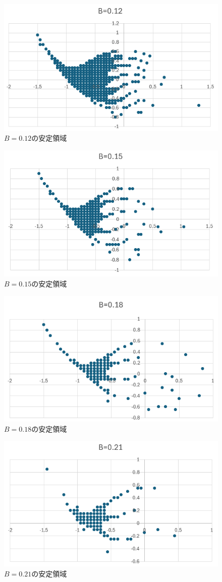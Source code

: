 \documentclass[dvipdfmx,a4paper]{jsarticle}
\begin{document}
\begin{figure}[H]
    \centering
    \includegraphics[width=0.45\linewidth]{summer/software-engineering/images/b0.12.png}
    \caption{$B=0.12$の安定領域}
    \label{fig:basin_b012}
\end{figure}
\begin{figure}[H]
    \centering
    \includegraphics[width=0.45\linewidth]{summer/software-engineering/images/b0.15.png}
    \caption{$B=0.15$の安定領域}
    \label{fig:basin_b015}
\end{figure}
\begin{figure}[H]
    \centering
    \includegraphics[width=0.45\linewidth]{summer/software-engineering/images/b0.18.png}
    \caption{$B=0.18$の安定領域}
    \label{fig:basin_b018}
\end{figure}
\begin{figure}[H]
    \centering
    \includegraphics[width=0.45\linewidth]{summer/software-engineering/images/b0.21.png}
    \caption{$B=0.21$の安定領域}
    \label{fig:basin_b021}
\end{figure}
\end{document}
